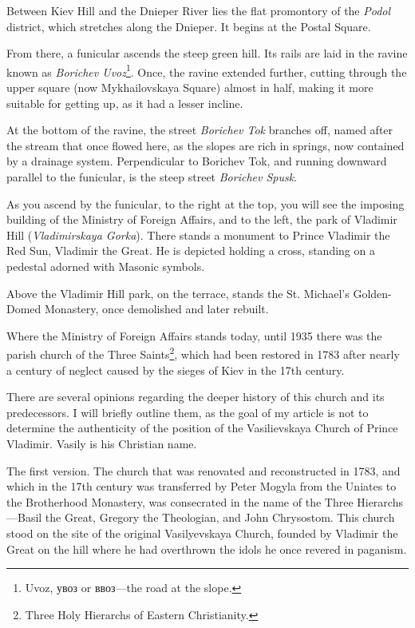 \documentclass[a5paper,11pt,openany]{article}
\begin{document}
Between Kiev Hill and the Dnieper River lies the flat promontory of the \textit{Podol} district, which stretches along the Dnieper. It begins at the Postal Square.

From there, a funicular ascends the steep green hill. Its rails are laid in the ravine known as \textit{Borichev Uvoz}\footnote{Uvoz, увоз or ввоз—the road at the slope.}. Once, the ravine extended further, cutting through the upper square (now Mykhailovskaya Square) almost in half, making it more suitable for getting up, as it had a lesser incline.

At the bottom of the ravine, the street \textit{Borichev Tok} branches off, named after the stream that once flowed here, as the slopes are rich in springs, now contained by a drainage system. Perpendicular to Borichev Tok, and running downward parallel to the funicular, is the steep street \textit{Borichev Spusk}.

As you ascend by the funicular, to the right at the top, you will see the imposing building of the Ministry of Foreign Affairs, and to the left, the park of Vladimir Hill (\textit{Vladimirskaya Gorka}). There stands a monument to Prince Vladimir the Red Sun, Vladimir the Great. He is depicted holding a cross, standing on a pedestal adorned with Masonic symbols.

Above the Vladimir Hill park, on the terrace, stands the St. Michael's Golden-Domed Monastery, once demolished and later rebuilt.

Where the Ministry of Foreign Affairs stands today, until 1935 there was the parish church of the Three Saints\footnote{Three Holy Hierarchs of Eastern Christianity.}, which had been restored in 1783 after nearly a century of neglect caused by the sieges of Kiev in the 17th century.

There are several opinions regarding the deeper history of this church and its predecessors. I will briefly outline them, as the goal of my article is not to determine the authenticity of the position of the Vasilievskaya Church of Prince Vladimir. Vasily is his Christian name.

The first version. The church that was renovated and reconstructed in 1783, and which in the 17th century was transferred by Peter Mogyla from the Uniates to the Brotherhood Monastery, was consecrated in the name of the Three Hierarchs—Basil the Great, Gregory the Theologian, and John Chrysostom. This church stood on the site of the original Vasilyevskaya Church, founded by Vladimir the Great on the hill where he had overthrown the idols he once revered in paganism.
\end{document}
